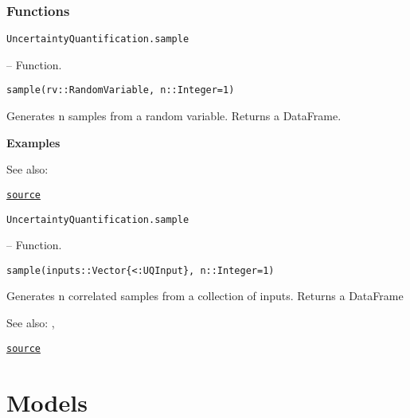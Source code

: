 \subsection{Functions}



\label{13536066633202303496}{}

\hypertarget{9310057082002087846}{\texttt{UncertaintyQuantification.sample}}  -- {Function.}

\begin{adjustwidth}{2em}{0pt}


\begin{verbatim}
sample(rv::RandomVariable, n::Integer=1)
\end{verbatim}

Generates n samples from a random variable. Returns a DataFrame.

\textbf{Examples}

See also: 



\href{https://github.com/friesischscott/UncertaintyQuantification.jl/blob/f5ee6cce729f0d6a57979257379c942cdf42f86f/src/inputs/randomvariables/randomvariable.jl#L21-L29}{\texttt{source}}


\end{adjustwidth}
\hypertarget{964858933162579450}{\texttt{UncertaintyQuantification.sample}}  -- {Function.}

\begin{adjustwidth}{2em}{0pt}


\begin{verbatim}
sample(inputs::Vector{<:UQInput}, n::Integer=1)
\end{verbatim}

Generates n correlated samples from a collection of inputs. Returns a DataFrame

See also: , 



\href{https://github.com/friesischscott/UncertaintyQuantification.jl/blob/f5ee6cce729f0d6a57979257379c942cdf42f86f/src/inputs/inputs.jl#L1-L7}{\texttt{source}}


\end{adjustwidth}

\chapter{Models}


